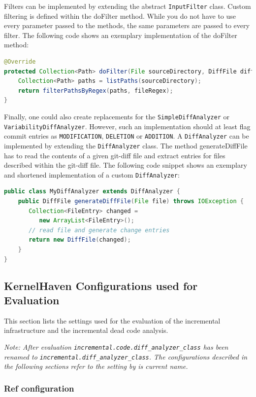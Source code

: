 \documentclass[a4paper]{article}
\begin{document}
Filters can be implemented by extending the abstract \texttt{InputFilter} class. Custom filtering is defined within the doFilter method. While you do not have to use every parameter passed to the methods, the same parameters are passed to every filter. The following code shows an exemplary implementation of the doFilter method:
\begin{lstlisting}[language=java]
@Override
protected Collection<Path> doFilter(File sourceDirectory, DiffFile diffFile, Pattern fileRegex, boolean includeDeletions) throws IOException {
	Collection<Path> paths = listPaths(sourceDirectory);	
	return filterPathsByRegex(paths, fileRegex);
}
\end{lstlisting}

Finally, one could also create replacements for the \texttt{SimpleDiffAnalyzer} or \texttt{VariabilityDiffAnalyzer}. However, such an implementation should at least flag commit entries as \texttt{MODIFICATION}, \texttt{DELETION} or \texttt{ADDITION}.
A \texttt{DiffAnalyzer} can be implemented by extending the \texttt{DiffAnalyzer} class. The method generateDiffFile has to read the contents of a given git-diff file and extract entries for files described within the git-diff file. The following code snippet shows an exemplary and shortened implementation of a custom \texttt{DiffAnalyzer}:

\begin{lstlisting}[language=java]
public class MyDiffAnalyzer extends DiffAnalyzer {
	public DiffFile generateDiffFile(File file) throws IOException {
	   Collection<FileEntry> changed = 
	      new ArrayList<FileEntry>();
	   // read file and generate change entries
	   return new DiffFile(changed);
	}
}
\end{lstlisting}



\subsection{KernelHaven Configurations used for Evaluation} \label{config-evaluation}
This section lists the settings used for the evaluation of the incremental infrastructure and the incremental dead code analysis.

\emph{Note: After evaluation \texttt{incremental.code.diff\_analyzer\_class} has been renamed to \texttt{incremental.diff\_analyzer\_class}. The configurations described in the following sections refer to the setting by is current name.}	


\subsubsection{Ref configuration}
\end{document}

